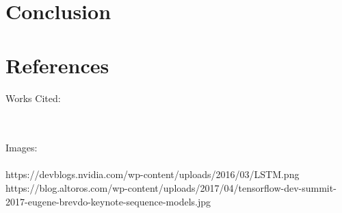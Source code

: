 \documentclass[titlepage]{article}
\begin{document}
\section{Conclusion}

\section{References}
\large{Works Cited:}\\
\small{

}
~\\~\\
\large{Images:}\\
\small{
\\https://devblogs.nvidia.com/wp-content/uploads/2016/03/LSTM.png
\\https://blog.altoros.com/wp-content/uploads/2017/04/tensorflow-dev-summit-2017-eugene-brevdo-keynote-sequence-models.jpg
}
\end{document}

